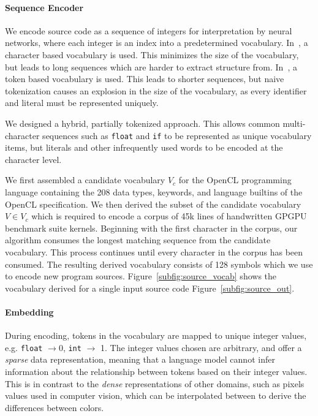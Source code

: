 \paragraph{Sequence Encoder}  We encode source code as a sequence of integers for interpretation by neural networks, where each integer is an index into a predetermined vocabulary. In~\cite{Cummins2017a}, a character based vocabulary is used. This minimizes the size of the vocabulary, but leads to long sequences which are harder to extract structure from. In~\cite{Allamanis2013a}, a token based vocabulary is used. This leads to shorter sequences, but naive tokenization causes an explosion in the size of the vocabulary, as every identifier and literal must be represented uniquely.

We designed a hybrid, partially tokenized approach. This allows common multi-character sequences such as \texttt{float} and \texttt{if} to be represented as unique vocabulary items, but literals and other infrequently used words to be encoded at the character level. 

We first assembled a candidate vocabulary $V_c$ for the OpenCL programming language containing the 208 data types, keywords, and language builtins of the OpenCL specification. We then derived the subset of the candidate vocabulary $V \in V_c$ which is required to encode a corpus of 45k lines of handwritten GPGPU benchmark suite kernels. Beginning with the first character in the corpus, our algorithm consumes the longest matching sequence from the candidate vocabulary. This process continues until every character in the corpus has been consumed. The resulting derived vocabulary consists of 128 symbols which we use to encode new program sources. Figure~\ref{subfig:source_vocab} shows the vocabulary derived for a single input source code Figure~\ref{subfig:source_out}.


\paragraph{Embedding} During encoding, tokens in the vocabulary are mapped to unique integer values, e.g. \texttt{float} $\rightarrow 0$, \texttt{int} $\rightarrow$ 1. The integer values chosen are arbitrary, and offer a \emph{sparse} data representation, meaning that a language model cannot infer information about the relationship between tokens based on their integer values. This is in contrast to the \emph{dense} representations of other domains, such as pixels values used in computer vision, which can be interpolated between to derive the differences between colors.

